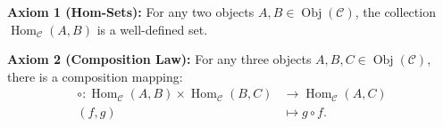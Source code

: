 \begin{content}
\textbf{Axiom 1 (Hom-Sets):} For any two objects $A, B \in \operatorname{Obj}(\mathcal{C})$, the collection $\operatorname{Hom}_{\mathcal{C}}(A, B)$ is a well-defined set.

\textbf{Axiom 2 (Composition Law):} For any three objects $A, B, C \in \operatorname{Obj}(\mathcal{C})$, there is a composition mapping:
\begin{align*}
\circ \colon \operatorname{Hom}_{\mathcal{C}}(A, B) \times \operatorname{Hom}_{\mathcal{C}}(B, C) &\longrightarrow \operatorname{Hom}_{\mathcal{C}}(A, C) \\
(f, g) &\longmapsto g \circ f.
\end{align*}
\end{content}

